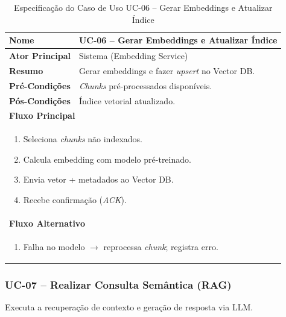 \begin{table}[H]
\centering
\caption{Especificação do Caso de Uso UC-06 – Gerar Embeddings e Atualizar Índice}
\label{tab:uc06}
\begin{tabular}{|p{4cm}|p{11cm}|}
\hline
\textbf{Nome}        & UC-06 – Gerar Embeddings e Atualizar Índice \\ \hline
\textbf{Ator Principal} & Sistema (Embedding Service) \\ \hline
\textbf{Resumo}      & Gerar embeddings e fazer \emph{upsert} no Vector DB. \\ \hline
\textbf{Pré-Condições} & \textit{Chunks} pré-processados disponíveis. \\ \hline
\textbf{Pós-Condições} & Índice vetorial atualizado. \\ \hline
\multicolumn{2}{|l|}{\textbf{Fluxo Principal}} \\ \hline
\multicolumn{2}{|p{15cm}|}{%
\begin{enumerate}[leftmargin=*]
  \item Seleciona \textit{chunks} não indexados.
  \item Calcula embedding com modelo pré-treinado.
  \item Envia vetor + metadados ao Vector DB.
  \item Recebe confirmação (\textit{ACK}).
\end{enumerate}} \\ \hline
\multicolumn{2}{|l|}{\textbf{Fluxo Alternativo}} \\ \hline
\multicolumn{2}{|p{15cm}|}{%
\begin{enumerate}[label=\arabic*a.,leftmargin=*]
  \item Falha no modelo $\rightarrow$ reprocessa \textit{chunk}; registra erro.
\end{enumerate}} \\ \hline
\end{tabular}
\end{table}


\subsubsection{UC-07 – Realizar Consulta Semântica (RAG)}

\noindent
Executa a recuperação de contexto e geração de resposta via LLM.

